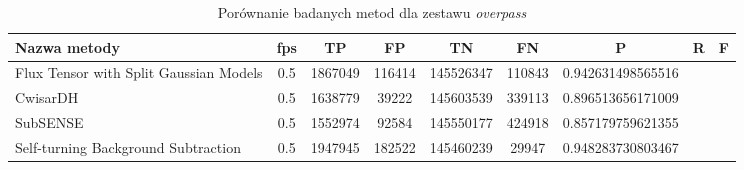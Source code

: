\begin{table}[h]
\caption{Porównanie badanych metod dla zestawu \textit{overpass}}
\label{tab:resultsOverpass}
\centering
\begin{tabular}{|l*{8}{|c}|}
  \hline 
  \textbf{Nazwa metody} & \textbf{fps} & \textbf{TP} & \textbf{FP} & \textbf{TN} & \textbf{FN} & \textbf{P} & \textbf{R} & \textbf{F}\\
  \hline
  Flux Tensor with Split Gaussian Models & 0.5 & 1867049 & 116414 & 145526347 & 110843 & 0.942631498565516\\
  \hline
  CwisarDH & 0.5 & 1638779 & 39222 & 145603539 & 339113 & 0.896513656171009\\
  \hline
  SubSENSE & 0.5 & 1552974 & 92584 & 145550177 & 424918 & 0.857179759621355\\
  \hline
  Self-turning Background Subtraction & 0.5 & 1947945 & 182522 & 145460239 & 29947 & 0.948283730803467\\
  \hline
\end{tabular}
\end{table}